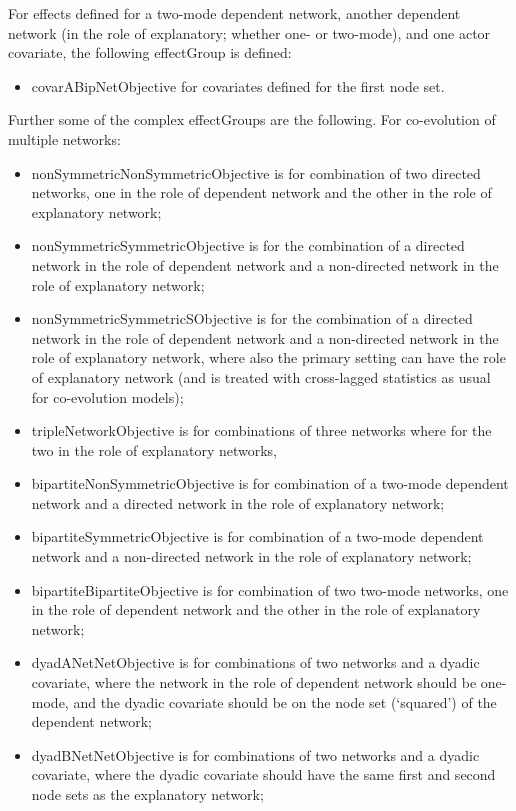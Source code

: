 \documentclass[a4paper,fleqn,11pt]{article}
\newcommand{\+}{\, + \,}
\newcommand{\sfn}[1]{\textsf{#1}}
\begin{document}
For effects defined for a two-mode dependent network, another dependent
network (in the role of explanatory; whether one- or two-mode), and one actor covariate,
the following effectGroup is defined:
\begin{itemize}
\item \sfn{covarABipNetObjective} for covariates defined for the first node set.
\end{itemize}
\medskip

Further some of the complex effectGroups are the following.
For co-evolution of multiple networks:
\begin{itemize}
\item \sfn{nonSymmetricNonSymmetricObjective} is for combination of two
    directed networks, one in the role of dependent network and the other
    in the role of explanatory network;
\item \sfn{nonSymmetricSymmetricObjective} is for the combination of a
    directed network in the role of dependent network and a non-directed network
    in the role of explanatory network;
\item \sfn{nonSymmetricSymmetricSObjective} is for the combination of a
    directed network in the role of dependent network and a non-directed network
    in the role of explanatory network, where also the primary setting
    can have the role of explanatory network (and is treated with cross-lagged
    statistics as usual for co-evolution models);
\item \sfn{tripleNetworkObjective} is for combinations
    of three networks where for the two in the role of explanatory networks,
\item \sfn{bipartiteNonSymmetricObjective} is for combination of
    a two-mode dependent network and a directed network
    in the role of explanatory network;
\item \sfn{bipartiteSymmetricObjective} is for combination of
    a two-mode dependent network and a non-directed network
    in the role of explanatory network;
\item \sfn{bipartiteBipartiteObjective} is for combination of two
    two-mode networks, one in the role of dependent network and the other
    in the role of explanatory network;
\item \sfn{dyadANetNetObjective} is for combinations
    of two networks and a dyadic covariate, where the network in the role
    of dependent network should be one-mode, and the dyadic covariate
    should be on the node set (`squared') of the dependent network;
\item \sfn{dyadBNetNetObjective} is for combinations
    of two networks and a dyadic covariate, where the dyadic covariate
    should have the same first and second node sets
    as the explanatory network;
\end{itemize}
\medskip
\end{document}
